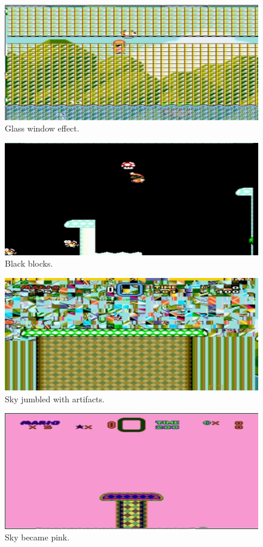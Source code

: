 \documentclass[]{article}
\begin{document}
\begin{figure}
\centering
\includegraphics{./img/Tuesday-13-22-36.jpg}
\caption{Glass window effect.}
\end{figure}

\begin{figure}
\centering
\includegraphics{./img/Tuesday-13-24-52.jpg}
\caption{Black blocks.}
\end{figure}

\begin{figure}
\centering
\includegraphics{./img/Tuesday-13-25-46.jpg}
\caption{Sky jumbled with artifacts.}
\end{figure}

\begin{figure}
\centering
\includegraphics{./img/Tuesday-13-26-58.jpg}
\caption{Sky became pink.}
\end{figure}
\end{document}
